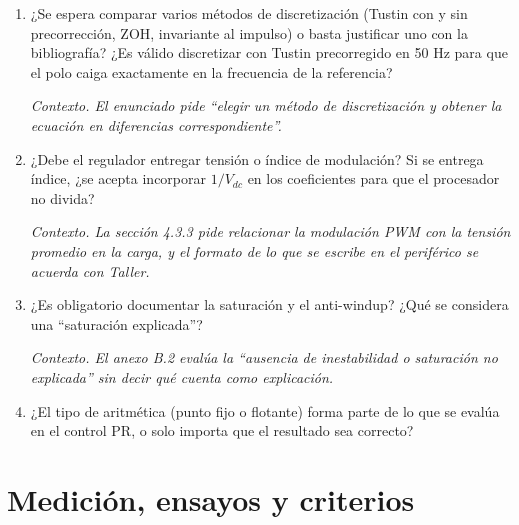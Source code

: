 \documentclass[11pt,a4paper]{article}
\newcommand{\ctx}[1]{\par\vspace{0.2em}\small\textit{Contexto. #1}\normalsize}
\begin{document}
\begin{enumerate}[resume]
  \item ¿Se espera comparar varios métodos de discretización (Tustin con y sin precorrección, ZOH, invariante al impulso) o basta justificar uno con la bibliografía? ¿Es válido discretizar con Tustin precorregido en 50 Hz para que el polo caiga exactamente en la frecuencia de la referencia?
  \ctx{El enunciado pide ``elegir un método de discretización y obtener la ecuación en diferencias correspondiente''.}

  \item ¿Debe el regulador entregar tensión o índice de modulación? Si se entrega índice, ¿se acepta incorporar $1/V_{dc}$ en los coeficientes para que el procesador no divida?
  \ctx{La sección 4.3.3 pide relacionar la modulación PWM con la tensión promedio en la carga, y el formato de lo que se escribe en el periférico se acuerda con Taller.}

  \item ¿Es obligatorio documentar la saturación y el anti-windup? ¿Qué se considera una ``saturación explicada''?
  \ctx{El anexo B.2 evalúa la ``ausencia de inestabilidad o saturación no explicada'' sin decir qué cuenta como explicación.}

  \item ¿El tipo de aritmética (punto fijo o flotante) forma parte de lo que se evalúa en el control PR, o solo importa que el resultado sea correcto?
\end{enumerate}

\section{Medición, ensayos y criterios}
\end{document}
